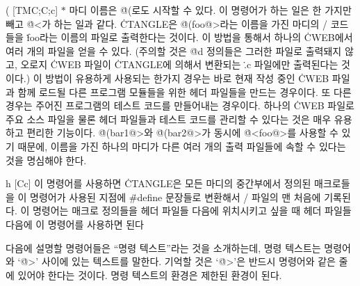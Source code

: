 \@( [TM\to C;\;C;\;c] $*$ 마디 이름은 \.{@(}로도 시작할 수 있다. 이
명령어가 하는 일은 한 가지만 빼고 \.{@<}가 하는 일과 같다.
\.{CTANGLE}은 \.{@(foo@>}라는 이름을 가진 마디의 \CEE/ 코드들을
\.{foo}라는 이름의 파일로 출력한다는 것이다. 이 방법을 통해서 하나의
\.{CWEB}에서 여러 개의 파일을 얻을 수 있다. (주의할 것은 \.{@d}
정의들은 그러한 파일로 출력돼지 않고, 오로지 \.{CWEB} 파일이
\.{CTANGLE}에 의해서 변환되는 \.{.c} 파일에만 출력된다는 것이다.) 이
방법이 유용하게 사용되는 한가지 경우는 바로 현재 작성 중인 \.{CWEB} 파일과
함께 로드될 다른 프로그램 모듈들을 위한 헤더 파일들을 만드는 경우이다.
또 다른 경우는 주어진 프로그램의 테스트 코드를 만들어내는
경우이다. 하나의 \.{CWEB} 파일로 주요 소스 파일을 물론 헤더 파일들과 테스트
코드를 관리할 수 있다는 것은 매우 유용하고 편리한 기능이다.  
\.{@(bar1@>}와 \.{@(bar2@>}가 동시에 \.{@<foo@>}를 사용할 수 있기 때문에,
이름을 가진 하나의 마디가 다른 여러 개의 출력 파일들에 속할 수 있다는 것을
명심해야 한다.   

\@{h} [Cc] 이 명령어를 사용하면 \.{CTANGLE}은 모든 마디의 중간부에서
정의된 매크로들을 이 명령어가 사용된 지점에 \.{\#define} 문장들로
변환해서 \CEE/ 파일의 맨 처음에 기록된다. 이
명령어는 매크로 정의들을 헤더 파일들 다음에 위치시키고 싶을 때 헤더
파일들 다음에 이 명령어를 사용하면 된다

\subsec
다음에 설명할 명령어들은 ``명령 텍스트''라는 것을
소개하는데, 명령 텍스트는 
명령어와 `\.{@>}' 사이에 있는 텍스트를 말한다. 기억할 것은
`\.{@>}'은 반드시 명령어와 같은 줄에 있어야 한다는 것이다. 
명령 텍스트의 환경은 제한된 환경이 된다. 

